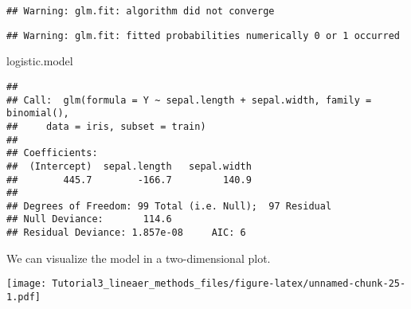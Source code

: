 \documentclass[]{article}
\newenvironment{Shaded}{\begin{snugshade}}{\end{snugshade}}
\newcommand{\KeywordTok}[1]{\textcolor[rgb]{0.13,0.29,0.53}{\textbf{#1}}}
\newcommand{\DataTypeTok}[1]{\textcolor[rgb]{0.13,0.29,0.53}{#1}}
\newcommand{\DecValTok}[1]{\textcolor[rgb]{0.00,0.00,0.81}{#1}}
\newcommand{\StringTok}[1]{\textcolor[rgb]{0.31,0.60,0.02}{#1}}
\newcommand{\OperatorTok}[1]{\textcolor[rgb]{0.81,0.36,0.00}{\textbf{#1}}}
\newcommand{\NormalTok}[1]{#1}
\begin{document}
\begin{verbatim}
## Warning: glm.fit: algorithm did not converge
\end{verbatim}

\begin{verbatim}
## Warning: glm.fit: fitted probabilities numerically 0 or 1 occurred
\end{verbatim}

\begin{Shaded}
\begin{Highlighting}[]
\NormalTok{logistic.model}
\end{Highlighting}
\end{Shaded}

\begin{verbatim}
## 
## Call:  glm(formula = Y ~ sepal.length + sepal.width, family = binomial(), 
##     data = iris, subset = train)
## 
## Coefficients:
##  (Intercept)  sepal.length   sepal.width  
##        445.7        -166.7         140.9  
## 
## Degrees of Freedom: 99 Total (i.e. Null);  97 Residual
## Null Deviance:       114.6 
## Residual Deviance: 1.857e-08     AIC: 6
\end{verbatim}

We can visualize the model in a two-dimensional plot.

\begin{Shaded}
\end{Shaded}

\texttt{[image: Tutorial3\_lineaer\_methods\_files/figure-latex/unnamed-chunk-25-1.pdf]}
\end{document}
